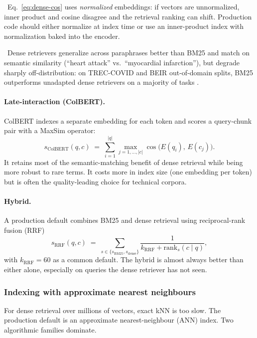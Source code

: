 \Assum\ Eq.~\eqref{eq:dense-cos} uses \emph{normalized} embeddings:
if vectors are unnormalized, inner product and cosine disagree and
the retrieval ranking can shift. Production code should either
normalize at index time or use an inner-product index with
normalization baked into the encoder.

\Emp\ Dense retrievers generalize across paraphrases better than
BM25 and match on semantic similarity (``heart attack'' vs.\
``myocardial infarction''), but degrade sharply off-distribution:
on TREC-COVID and BEIR out-of-domain splits, BM25 outperforms
unadapted dense retrievers on a majority of tasks
\citep{thakur2021beir}.

\paragraph{Late-interaction (ColBERT).}
ColBERT \citep{khattab2020colbert} indexes a separate embedding for
each token and scores a query-chunk pair with a MaxSim operator:
\begin{equation}
  s_{\mathrm{ColBERT}}(q, c)
  \;=\; \sum_{i=1}^{|q|} \max_{j=1,\dots,|c|}
         \cos\!\bigl(E(q_i),\, E(c_j)\bigr).
  \label{eq:colbert-maxsim}
\end{equation}
It retains most of the semantic-matching benefit of dense retrieval
while being more robust to rare terms. It costs more in index size
(one embedding per token) but is often the quality-leading choice
for technical corpora.

\paragraph{Hybrid.}
A production default combines BM25 and dense retrieval using
reciprocal-rank fusion (RRF)
\begin{equation}
  s_{\mathrm{RRF}}(q, c)
  \;=\; \sum_{s \in \{s_{\mathrm{BM25}}, s_{\mathrm{dense}}\}}
         \frac{1}{k_\mathrm{RRF} + \mathrm{rank}_s(c \mid q)},
  \label{eq:rrf}
\end{equation}
with $k_\mathrm{RRF}=60$ as a common default. The hybrid is almost
always better than either alone, especially on queries the dense
retriever has not seen.

\subsubsection{Indexing with approximate nearest neighbours}

For dense retrieval over millions of vectors, exact kNN is too
slow. The production default is an approximate nearest-neighbour
(ANN) index. Two algorithmic families dominate.

